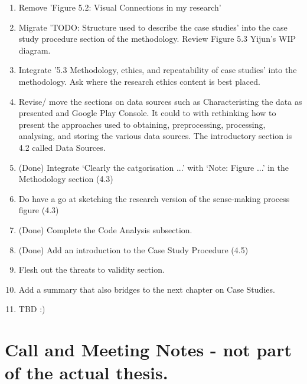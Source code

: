 \begin{enumerate}
    \item Remove 'Figure 5.2: Visual Connections in my research'

    \item Migrate 'TODO: Structure used to describe the case studies' into the case study procedure section of the methodology. Review Figure 5.3 Yijun's WIP diagram.

    \item Integrate '5.3 Methodology, ethics, and repeatability of case studies' into the methodology. Ask where the research ethics content is best placed.

    \item Revise/ move the sections on data sources such as Characteristing the data as presented and Google Play Console. It could to with rethinking how to present the approaches used to obtaining, preprocessing, processing, analysing, and storing the various data sources. The introductory section is 4.2 called Data Sources.

    \item (Done) Integrate `Clearly the catgorisation ...' with `Note: Figure ...' in the Methodology section (4.3)

    \item Do have a go at sketching the research version of the sense-making process figure (4.3)

    \item (Done) Complete the Code Analysis subsection.

    \item (Done) Add an introduction to the Case Study Procedure (4.5)

    \item Flesh out the threats to validity section.

    \item Add a summary that also bridges to the next chapter on Case Studies.

    \item TBD :)

\end{enumerate}

\clearpage
\section{Call and Meeting Notes - not part of the actual thesis.}

